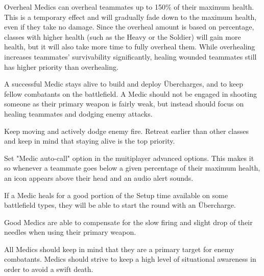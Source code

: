 Overheal  Medics can overheal teammates up to 150\% of their maximum health. This is a temporary effect and will gradually fade down to the maximum health, even if they take no damage. Since the overheal amount is based on percentage, classes with higher health (such as the Heavy or the Soldier) will gain more health, but it will also take more time to fully overheal them. While overhealing increases teammates' survivability significantly, healing wounded teammates still has higher priority than overhealing.

A successful Medic stays alive to build and deploy Übercharges, and to keep fellow combatants on the battlefield. A Medic should not be engaged in shooting someone as their primary weapon is fairly weak, but instead should focus on healing teammates and dodging enemy attacks.

Keep moving and actively dodge enemy fire. Retreat earlier than other classes and keep in mind that staying alive is the top priority.

Set "Medic auto-call" option in the muitiplayer advanced options. This makes it so whenever a teammate goes below a given percentage of their maximum health, an icon appears above their head and an audio alert sounds.

If a Medic heals for a good portion of the Setup time available on some battlefield types, they will be able to start the round with an Übercharge.

Good Medics are able to compensate for the slow firing and slight drop of their needles when using their primary weapon.

All Medics should keep in mind that they are a primary target for enemy combatants. Medics should strive to keep a high level of situational awareness in order to avoid a swift death.